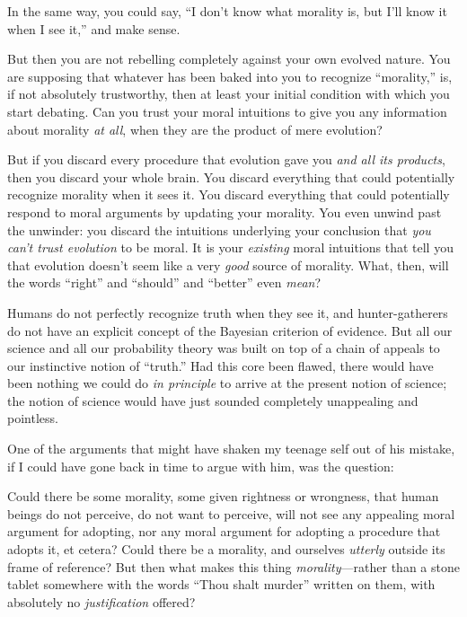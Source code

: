 {
 In the same way, you could say, ``I
don't know what morality is, but I'll
know it when I see it,'' and make sense.}

{
 But then you are not rebelling completely against your own evolved
nature. You are supposing that whatever has been baked into you to
recognize ``morality,'' is, if not
absolutely trustworthy, then at least your initial condition with which
you start debating. Can you trust your moral intuitions to give you any
information about morality \textit{at all}, when they are the product
of mere evolution?}

{
 But if you discard every procedure that evolution gave you
\textit{and all its products}, then you discard your whole brain. You
discard everything that could potentially recognize morality when it
sees it. You discard everything that could potentially respond to moral
arguments by updating your morality. You even unwind past the unwinder:
you discard the intuitions underlying your conclusion that \textit{you
can't trust evolution} to be moral. It is your
\textit{existing} moral intuitions that tell you that evolution
doesn't seem like a very \textit{good} source of
morality. What, then, will the words
``right'' and
``should'' and
``better'' even \textit{mean}?}

{
 Humans do not perfectly recognize truth when they see it, and
hunter-gatherers do not have an explicit concept of the Bayesian
criterion of evidence. But all our science and all our probability
theory was built on top of a chain of appeals to our instinctive notion
of ``truth.'' Had this core been
flawed, there would have been nothing we could do \textit{in principle}
to arrive at the present notion of science; the notion of science would
have just sounded completely unappealing and pointless.}

{
 One of the arguments that might have shaken my teenage self out of
his mistake, if I could have gone back in time to argue with him, was
the question:}

{
 Could there be some morality, some given rightness or wrongness,
that human beings do not perceive, do not want to perceive, will not
see any appealing moral argument for adopting, nor any moral argument
for adopting a procedure that adopts it, et cetera? Could there be a
morality, and ourselves \textit{utterly} outside its frame of
reference? But then what makes this thing \textit{morality}{}---rather
than a stone tablet somewhere with the words ``Thou
shalt murder'' written on them, with absolutely no
\textit{justification} offered?}

